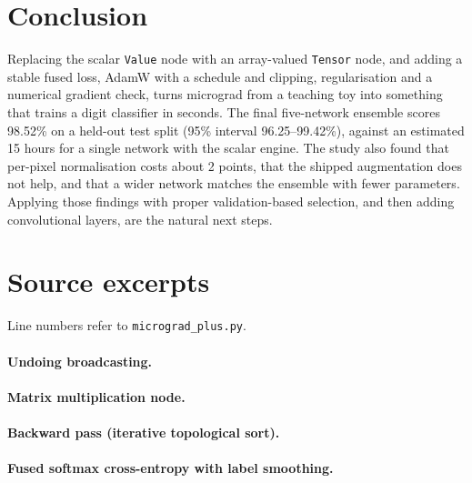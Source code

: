 \documentclass[11pt,a4paper]{article}
\newcommand{\code}[1]{\texttt{#1}}
\begin{document}
\section{Conclusion}
Replacing the scalar \code{Value} node with an array-valued \code{Tensor} node, and adding a stable fused loss, AdamW with a schedule and clipping, regularisation and a numerical gradient check, turns micrograd from a teaching toy into something that trains a digit classifier in seconds. The final five-network ensemble scores 98.52\% on a held-out test split (95\% interval 96.25--99.42\%), against an estimated 15 hours for a single network with the scalar engine. The study also found that per-pixel normalisation costs about 2 points, that the shipped augmentation does not help, and that a wider network matches the ensemble with fewer parameters. Applying those findings with proper validation-based selection, and then adding convolutional layers, are the natural next steps.

\appendix
\section{Source excerpts}
Line numbers refer to \code{micrograd\_plus.py}.

\paragraph{Undoing broadcasting.}


\paragraph{Matrix multiplication node.}


\paragraph{Backward pass (iterative topological sort).}


\paragraph{Fused softmax cross-entropy with label smoothing.}

\end{document}
